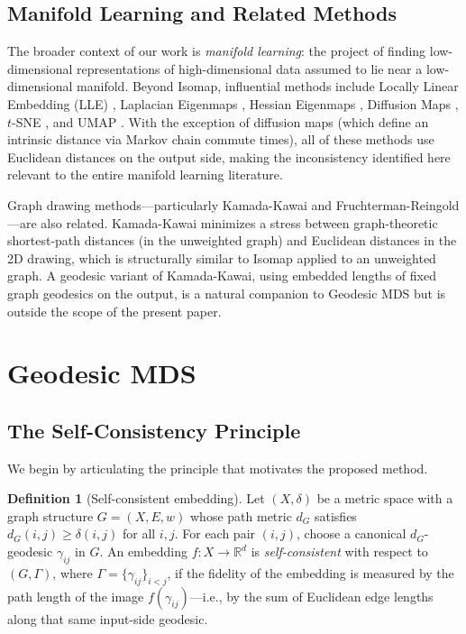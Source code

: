 \documentclass[11pt]{article}
\theoremstyle{definition}
\newtheorem{definition}{Definition}[section]
\newcommand{\R}{\mathbb{R}}
\begin{document}
\subsection{Manifold Learning and Related Methods}
\label{sec:manifold_learning}

The broader context of our work is \emph{manifold learning}: the project
of finding low-dimensional representations of high-dimensional data assumed
to lie near a low-dimensional manifold.  Beyond Isomap, influential methods
include Locally Linear Embedding (LLE) \citep{roweis2000nonlinear},
Laplacian Eigenmaps \citep{belkin2003laplacian}, Hessian Eigenmaps
\citep{donoho2003hessian}, Diffusion Maps \citep{coifman2006diffusion},
$t$-SNE \citep{vandermaaten2008tsne}, and UMAP \citep{mcinnes2018umap}.
With the exception of diffusion maps (which define an intrinsic distance via
Markov chain commute times), all of these methods use Euclidean distances
on the output side, making the inconsistency identified here relevant to the
entire manifold learning literature.

Graph drawing methods---particularly Kamada-Kawai \citep{kamada1989algorithm}
and Fruchterman-Reingold \citep{fruchterman1991graph}---are also related.
Kamada-Kawai minimizes a stress between graph-theoretic shortest-path
distances (in the unweighted graph) and Euclidean distances in the 2D
drawing, which is structurally similar to Isomap applied to an unweighted
graph.  A geodesic variant of Kamada-Kawai, using embedded lengths of
fixed graph geodesics on the output, is a natural companion to Geodesic
MDS but is outside the scope of the present paper.

\section{Geodesic MDS}
\label{sec:geodesic_mds}

\subsection{The Self-Consistency Principle}
\label{sec:self_consistency}

We begin by articulating the principle that motivates the proposed method.

\begin{definition}[Self-consistent embedding]
  \label{def:self_consistency}
  Let $(X, \delta)$ be a metric space with a graph structure $G = (X, E,
  w)$ whose path metric $d_G$ satisfies $d_G(i,j) \geq \delta(i,j)$ for
  all $i,j$.  For each pair $(i,j)$, choose a canonical $d_G$-geodesic
  $\gamma_{ij}$ in $G$.  An embedding $f: X \to \R^d$ is
  \emph{self-consistent} with respect to $(G, \Gamma)$, where
  $\Gamma = \{\gamma_{ij}\}_{i<j}$, if the fidelity of the embedding is
  measured by the path length of the image $f(\gamma_{ij})$---i.e., by the
  sum of Euclidean edge lengths along that same input-side geodesic.
\end{definition}
\end{document}
